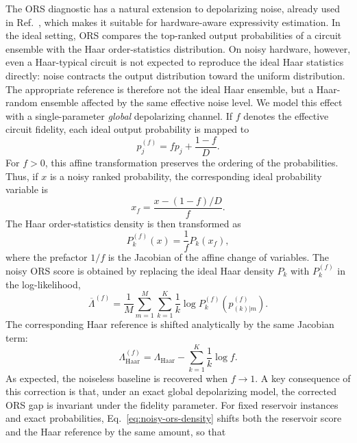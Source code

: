 \documentclass[
    aps,
    pre,
    amsmath,
    amssymb,
    reprint,
    superscriptaddress,
    preprintnumbers,
]{revtex4-2}
\begin{document}
The ORS diagnostic has a natural extension to depolarizing noise, already used in Ref.~\cite{micklitz2025ors}, which makes it suitable for hardware-aware expressivity estimation. In the ideal setting, ORS compares the top-ranked output probabilities of a circuit ensemble with the Haar order-statistics distribution. On noisy hardware, however, even a Haar-typical circuit is not expected to reproduce the ideal Haar statistics directly: noise contracts the output distribution toward the uniform distribution. The appropriate reference is therefore not the ideal Haar ensemble, but a Haar-random ensemble affected by the same effective noise level. We model this effect with a single-parameter \textit{global} depolarizing channel. If $f$ denotes the effective circuit fidelity, each ideal output probability is mapped to
\begin{equation}
p_j^{(f)}
=
f p_j + \frac{1-f}{D}.
\label{eq:depol-probability}
\end{equation}
For $f>0$, this affine transformation preserves the ordering of the probabilities. Thus, if $x$ is a noisy ranked probability, the corresponding ideal probability variable is
\begin{equation}
x_f
=
\frac{x-(1-f)/D}{f}.
\label{eq:inverse-depol-map}
\end{equation}
The Haar order-statistics density is then transformed as
\begin{equation}
P_k^{(f)}(x)
=
\frac{1}{f} P_k(x_f),
\label{eq:noisy-ors-density}
\end{equation}
where the prefactor $1/f$ is the Jacobian of the affine change of variables. The noisy ORS score is obtained by replacing the ideal Haar density $P_k$ with $P_k^{(f)}$ in the log-likelihood,
\begin{equation}
\overline{\Lambda}^{(f)}
=
\frac{1}{M}
\sum_{m=1}^{M}
\sum_{k=1}^{K}
\frac{1}{k}
\log P_k^{(f)}
\left(
p_{(k)|m}^{(f)}
\right).
\label{eq:noisy-lambda-score}
\end{equation}
The corresponding Haar reference is shifted analytically by the same Jacobian term:
\begin{equation}
\Lambda_{\mathrm{Haar}}^{(f)}
=
\Lambda_{\mathrm{Haar}}
-
\sum_{k=1}^{K}\frac{1}{k} \log f.
\label{eq:noisy-haar-baseline}
\end{equation}
As expected, the noiseless baseline is recovered when $f\to 1$. A key consequence of this correction is that, under an exact global depolarizing model, the corrected ORS gap is invariant under the fidelity parameter. For fixed reservoir instances and exact probabilities, Eq.~\eqref{eq:noisy-ors-density} shifts both the reservoir score and the Haar reference by the same amount, so that
\end{document}
